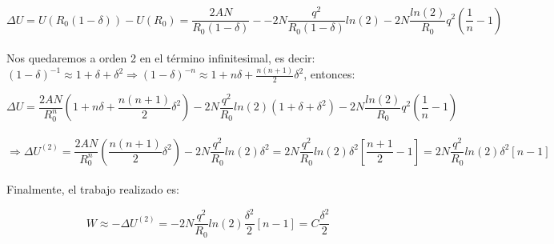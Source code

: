 \documentclass[a4paper]{article}
\begin{document}
$$ \Delta U = U(R_{0}(1 - \delta)) - U(R_{0}) = \frac{2AN}{R_{0}(1 - \delta)} - -2N\frac{q^{2}}{R_{0}(1 - \delta)}ln(2) - 2N\frac{ln(2)}{R_{0}}q^{2}\left(\frac{1}{n} - 1 \right)$$\\

Nos quedaremos a orden 2 en el t\'ermino infinitesimal, es decir: $ (1 - \delta)^{-1} \approx 1 + \delta + \delta^{2} \Rightarrow (1 - \delta)^{-n} \approx 1 + n\delta + \frac{n(n+1)}{2}\delta^{2}$, entonces:

$$ \Delta U = \frac{2AN}{R_{0}^{n}}\left(1 + n\delta + \frac{n(n+1)}{2}\delta^{2}\right) -2N\frac{q^{2}}{R_{0}}ln(2)\left(1 + \delta + \delta^{2}\right) - 2N\frac{ln(2)}{R_{0}}q^{2}\left(\frac{1}{n} - 1 \right)$$\\

$$ \Rightarrow \Delta U^{(2)} = \frac{2AN}{R_{0}^{n}}\left(\frac{n(n+1)}{2}\delta^{2}\right) -2N\frac{q^{2}}{R_{0}}ln(2)\delta^{2} = 2N\frac{q^{2}}{R_{0}}ln(2)\delta^{2}\left[ \frac{n+1}{2} - 1\right] = 2N\frac{q^{2}}{R_{0}}ln(2)\delta^{2}\left[ n - 1\right]$$\\

Finalmente, el trabajo realizado es:

$$ W \approx - \Delta U^{(2)} = -2N\frac{q^{2}}{R_{0}}ln(2)\frac{\delta^{2}}{2}\left[ n - 1\right] = C\frac{\delta^{2}}{2}$$

\subsection{}
\subsection{}


\newpage
\begin{thebibliography}{99} %
 
\end{thebibliography}


\end{document}

